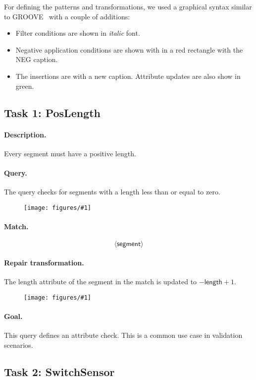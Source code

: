\documentclass[submission,copyright,creativecommons]{eptcs}
\newcommand{\ttcpattern}[1]{
\begin{figure}[H] 
	\centering
	\texttt{[image: figures/\#1]}
\end{figure}}
\begin{document}
For defining the patterns and transformations, we used a graphical syntax similar to GROOVE~\cite{rensink2004groove} with a couple of additions:

\begin{itemize}
  \item Filter conditions are shown in \textit{italic} font.
  \item Negative application conditions are shown with in a \textcolor{negcolor}{red} rectangle with the \textcolor{negcolor}{\textsf{NEG}} caption.
  \item The insertions are with a \textcolor{newcolor}{\guillemotleft{}new\guillemotright{}} caption. Attribute updates are also show in \textcolor{newcolor}{green}. %
\end{itemize}

\subsection{Task 1: PosLength}
\label{poslength}
\paragraph{Description.} Every segment must have a positive length.
\paragraph{Query.} The query checks for segments with a length less than or equal to zero.
\ttcpattern{pattern-poslength}
\paragraph{Match.} $$\langle \mathsf{segment} \rangle$$ 
\paragraph{Repair transformation.} The \textsf{length} attribute of the \textsf{segment} in the match is updated to $- \mathsf{length} + 1$.
\ttcpattern{transformation-poslength}
\paragraph{Goal.} This query defines an attribute check. This is a common use case in validation scenarios.


\subsection{Task 2: SwitchSensor}
\label{switchsensor}
\end{document}
